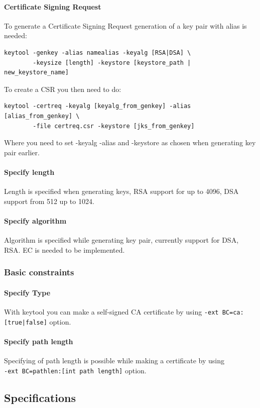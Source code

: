 \documentclass[10pt, a4paper]{report}
\begin{document}
      \paragraph{Certificate Signing Request}
To generate a Certificate Signing Request generation of a key pair with alias is needed:
\begin{verbatim}
keytool -genkey -alias namealias -keyalg [RSA|DSA] \
        -keysize [length] -keystore [keystore_path | new_keystore_name]
\end{verbatim}
To create a CSR you then need to do:
\begin{verbatim}
keytool -certreq -keyalg [keyalg_from_genkey] -alias [alias_from_genkey] \
        -file certreq.csr -keystore [jks_from_genkey]
\end{verbatim}
Where you need to set -keyalg -alias and -keystore as chosen when generating key pair earlier.

      \paragraph{Specify length}
Length is specified when generating keys, RSA support for up to 4096, DSA support from 512 up to 1024.

      \paragraph{Specify algorithm}
Algorithm is specified while generating key pair, currently support for DSA, RSA. EC is needed to be implemented.      
    \subsubsection{Basic constraints}
    
      \paragraph{Specify Type}
With keytool you can make a self-signed CA certificate by using \verb+-ext BC=ca:[true|false]+ option.

      \paragraph{Specify path length}
Specifying of path length is possible while making a certificate by using  \\
\verb+-ext BC=pathlen:[int path length]+ option.

  \subsection{Specifications}
  
\end{document}

